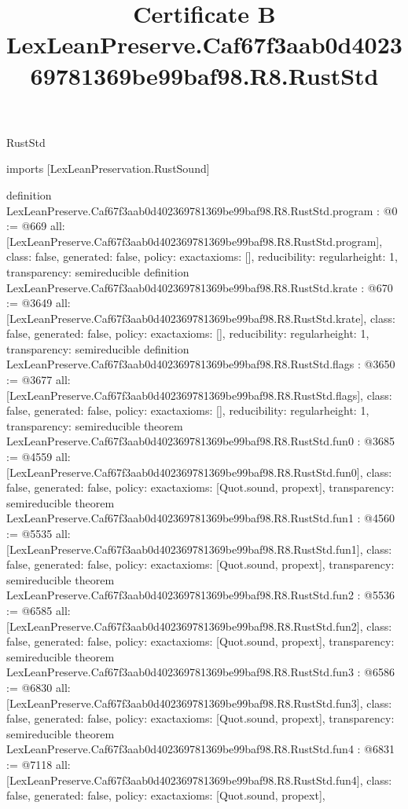 \begin{lexlean}{RustStd}
\title{Certificate B LexLeanPreserve.Caf67f3aab0d402369781369be99baf98.R8.RustStd}
\begin{coremodule}
imports [LexLeanPreservation.RustSound]

definition LexLeanPreserve.Caf67f3aab0d402369781369be99baf98.R8.RustStd.program : @0 := @669 {
  all: [LexLeanPreserve.Caf67f3aab0d402369781369be99baf98.R8.RustStd.program],
  class: false,
  generated: false,
  policy: exact{axioms: []},
  reducibility: regular{height: 1},
  transparency: semireducible
}
definition LexLeanPreserve.Caf67f3aab0d402369781369be99baf98.R8.RustStd.krate : @670 := @3649 {
  all: [LexLeanPreserve.Caf67f3aab0d402369781369be99baf98.R8.RustStd.krate],
  class: false,
  generated: false,
  policy: exact{axioms: []},
  reducibility: regular{height: 1},
  transparency: semireducible
}
definition LexLeanPreserve.Caf67f3aab0d402369781369be99baf98.R8.RustStd.flags : @3650 := @3677 {
  all: [LexLeanPreserve.Caf67f3aab0d402369781369be99baf98.R8.RustStd.flags],
  class: false,
  generated: false,
  policy: exact{axioms: []},
  reducibility: regular{height: 1},
  transparency: semireducible
}
theorem LexLeanPreserve.Caf67f3aab0d402369781369be99baf98.R8.RustStd.fun0 : @3685 := @4559 {
  all: [LexLeanPreserve.Caf67f3aab0d402369781369be99baf98.R8.RustStd.fun0],
  class: false,
  generated: false,
  policy: exact{axioms: [Quot.sound, propext]},
  transparency: semireducible
}
theorem LexLeanPreserve.Caf67f3aab0d402369781369be99baf98.R8.RustStd.fun1 : @4560 := @5535 {
  all: [LexLeanPreserve.Caf67f3aab0d402369781369be99baf98.R8.RustStd.fun1],
  class: false,
  generated: false,
  policy: exact{axioms: [Quot.sound, propext]},
  transparency: semireducible
}
theorem LexLeanPreserve.Caf67f3aab0d402369781369be99baf98.R8.RustStd.fun2 : @5536 := @6585 {
  all: [LexLeanPreserve.Caf67f3aab0d402369781369be99baf98.R8.RustStd.fun2],
  class: false,
  generated: false,
  policy: exact{axioms: [Quot.sound, propext]},
  transparency: semireducible
}
theorem LexLeanPreserve.Caf67f3aab0d402369781369be99baf98.R8.RustStd.fun3 : @6586 := @6830 {
  all: [LexLeanPreserve.Caf67f3aab0d402369781369be99baf98.R8.RustStd.fun3],
  class: false,
  generated: false,
  policy: exact{axioms: [Quot.sound, propext]},
  transparency: semireducible
}
theorem LexLeanPreserve.Caf67f3aab0d402369781369be99baf98.R8.RustStd.fun4 : @6831 := @7118 {
  all: [LexLeanPreserve.Caf67f3aab0d402369781369be99baf98.R8.RustStd.fun4],
  class: false,
  generated: false,
  policy: exact{axioms: [Quot.sound, propext]},
}
\end{coremodule}
\end{lexlean}
